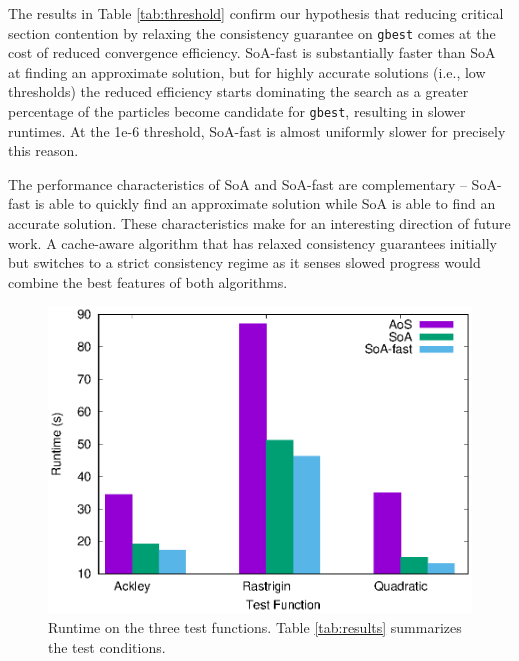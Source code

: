 The results in Table \ref{tab:threshold} confirm our hypothesis that
reducing critical section contention by relaxing the consistency
guarantee on \texttt{gbest} comes at the cost of reduced convergence efficiency. SoA-fast is
substantially faster than SoA at finding an approximate solution, but for highly
accurate solutions (i.e., low thresholds) the reduced efficiency
starts dominating the search as a greater percentage of the particles become candidate
for \texttt{gbest}, resulting in slower runtimes.
At the 1e-6 threshold, SoA-fast is almost
uniformly slower for precisely this reason.

The performance characteristics of SoA and SoA-fast are complementary --
SoA-fast is able to quickly find an approximate solution while SoA is able to
find an accurate solution. These characteristics make for an interesting
direction of  future work. A cache-aware algorithm that has relaxed
consistency guarantees initially but switches to a strict consistency regime as
it senses slowed progress would combine the best features of both algorithms.



% 

\begin{figure}
  \includegraphics[width=\columnwidth]{../img/output/all3time}
  \caption{Runtime on the three test functions. Table \ref{tab:results} summarizes
    the test conditions.}
  \label{fig:all3time}
\end{figure}

